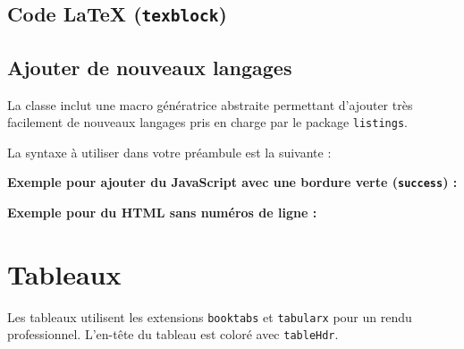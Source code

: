 \subsection{Code LaTeX (\texttt{texblock})}

\subsection{Ajouter de nouveaux langages}
La classe inclut une macro génératrice abstraite permettant d'ajouter très facilement de nouveaux langages pris en charge par le package \texttt{listings}. 

La syntaxe à utiliser dans votre préambule est la suivante :
\begin{texblock}
\end{texblock}

\textbf{Exemple pour ajouter du JavaScript avec une bordure verte (\texttt{success}) :}
\begin{texblock}
\end{texblock}

\textbf{Exemple pour du HTML sans numéros de ligne :}
\begin{texblock}
\end{texblock}


\section{Tableaux}

Les tableaux utilisent les extensions \texttt{booktabs} et \texttt{tabularx} pour un rendu professionnel. L'en-tête du tableau est coloré avec \texttt{tableHdr}.


